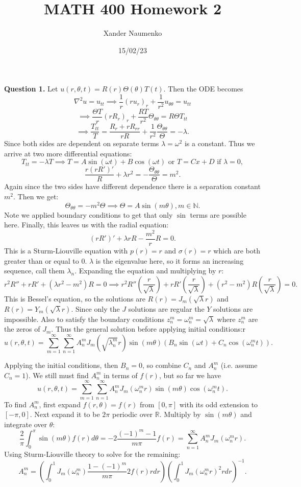\documentclass[letterpaper, reqno,11pt]{article}
\begin{document}
\title{MATH 400 Homework 2}
\date{15/02/23}
\author{Xander Naumenko}
\maketitle

{\medskip\noindent\bf Question 1.} Let $u(r, \theta, t)=R(r)\Theta(\theta)T(t)$. Then the ODE becomes 
\[
\nabla ^2 u=u_{tt}\implies \frac{1}{r}(ru_r)_r+\frac{1}{r^2}u_{\theta\theta}=u_{t t}
\]
\[
\implies \frac{\Theta T}{r}\left(rR_r\right)_r+\frac{RT}{r^2}\Theta_{\theta\theta}=R\Theta T_{tt}
\]
\[
    \implies \frac{T_{t t}}{T}=\frac{R_r+rR_{rr}}{rR}+\frac{1}{r^2}\frac{\Theta_{\theta\theta}}{\Theta}=-\lambda
.\]
Since both sides are dependent on separate terms $\lambda=\omega^2$ is a constant. Thus we arrive at two more differential equations: 
\[
T_{t t}=-\lambda T\implies T=A\sin(\omega t)+B\cos(\omega t)\text{ or }T=Cx+D\text{ if }\lambda=0
,\]
\[
    \frac{r(rR')'}{R}+\lambda r^2=-\frac{\Theta_{\theta\theta}}{\Theta}=m^2
.\]
Again since the two sides have different dependence there is a separation constant $m^2$. Then we get: 
\[
    \Theta_{\theta \theta}=-m^2\Theta \implies \Theta=A\sin(m\theta), m\in\mathbb{N}
.\]
Note we applied boundary conditions to get that only $\sin$ terms are possible here. Finally, this leaves us with the radial equation: 
\[
    \left( rR' \right)' +\lambda r R-\frac{m^2}{r} R=0
.\]
This is a Sturm-Liouville equation with $p(r)=r$ and $\sigma(r)=r$ which are both greater than or equal to $0$. $\lambda$ is the eigenvalue here, so it forms an increasing sequence, call them $\lambda_n$. Expanding the equation and multiplying by $r$: 
\[
    r^2R''+rR'+(\lambda r^2-m^2)R=0\implies r^2 R''\left(\frac{r}{\sqrt{\lambda} }\right)+rR'\left( \frac{r}{\sqrt{\lambda} } \right) +\left( r^2-m^2 \right) R\left( \frac{r}{\sqrt{\lambda}} \right) =0
.\]
This is Bessel's equation, so the solutions are $R(r)=J_m(\sqrt{\lambda} r)$ and $R(r)=Y_m(\sqrt{\lambda} r)$. Since only the $J$ solutions are regular the $Y$ solutions are impossible. Also to satisfy the boundary conditions $z_n^m=\omega_n^m=\sqrt{\lambda} $ where $z_n^m$ are the zeros of $J_m$. Thus the general solution before applying initial conditions:r
\[
    u(r, \theta, t)=\sum_{m=1}^\infty\sum_{n=1}^{\infty}A^{m}_nJ_m(\sqrt{\lambda_n^m} r)\sin(m\theta)\left(B_n\sin(\omega t)+C_n\cos(\omega_n^m t)\right) 
.\]

Applying the initial conditions, then $B_n=0$, so combine $C_n$ and $A_n^m$ (i.e. assume $C_n=1$). We still must find $A_n^m$ in terms of $f(r)$, but so far we have
\[
    u(r, \theta, t)=\sum_{m=1}^\infty\sum_{n=1}^{\infty}A^{m}_nJ_m(\omega_n^m r)\sin(m\theta)\cos(\omega_n^m t) 
.\]
To find $A_n^m$, first expand $f(r,\theta)=f(r)$ from $[0,\pi]$ with its odd extension to $[-\pi,0]$. Next expand it to be $2\pi$ periodic over $\mathbb{R}$. Multiply by $\sin(m\theta)$ and integrate over $\theta$: 
\[
\frac{2}{\pi}\int_{0}^{\pi}\sin(m\theta)f(r)d\theta=-2\frac{\left(-1\right)^{m}-1}{m\pi}f(r)=\sum_{n=1}^{\infty}A_{n}^{m}J_m\left( \omega_{n}^{m}r \right)
.\]
Using Sturm-Liouville theory to solve for the remaining:
\[
A_n^m=\left(\int_0^1J_m\left( \omega_n^m \right) \frac{1-\left(-1\right)^{m}}{m\pi}2f(r)rdr\right)\left( \int_0^1 J_m(\omega_n^m r)^2 rdr \right)^{-1}
.\]
\end{document}
